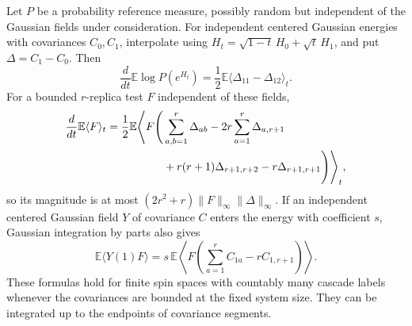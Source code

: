 \begin{lemma}
\label{arr:calculus}
Let $P$ be a probability reference measure, possibly random but
independent of the Gaussian fields under consideration.  For independent
centered Gaussian energies with covariances $C_0,C_1$, interpolate using
$H_t=\sqrt{1-t}\,H_0+\sqrt t\,H_1$, and put
$\Delta=C_1-C_0$.  Then
\begin{equation}
 \frac{d}{dt}\mathbb E\log P(e^{H_t})
 =\frac12\mathbb E\langle\Delta_{11}-\Delta_{12}\rangle_t.
 \label{arr:gaussian-log-derivative}
\end{equation}
For a bounded $r$-replica test $F$ independent of these fields,
\begin{align}
 \frac{d}{dt}\mathbb E\langle F\rangle_t
 =\frac12\mathbb E\Bigg\langle F\Bigg(
 &\sum_{a,b=1}^r\Delta_{ab}
 -2r\sum_{a=1}^r\Delta_{a,r+1}\notag\\
 &+r(r+1)\Delta_{r+1,r+2}-r\Delta_{r+1,r+1}
 \Bigg)\Bigg\rangle_t,
 \label{arr:replica-derivative}
\end{align}
so its magnitude is at most
$(2r^2+r)\|F\|_\infty\|\Delta\|_\infty$.
If an independent centered Gaussian field $Y$ of covariance $C$ enters
the energy with coefficient $s$, Gaussian integration by parts also gives
\begin{equation}
 \mathbb E\langle Y(1)F\rangle
 =s\,\mathbb E\left\langle
  F\left(\sum_{a=1}^r C_{1a}-rC_{1,r+1}\right)
 \right\rangle.
 \label{arr:gaussian-insertion}
\end{equation}
These formulas hold for finite spin spaces with countably many cascade
labels whenever the covariances are bounded at the fixed system size.
They can be integrated up to the endpoints of covariance segments.
\end{lemma}

